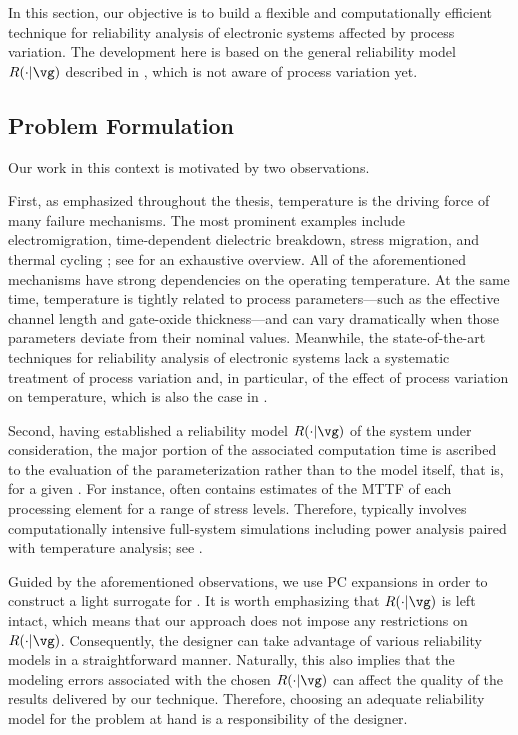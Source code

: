 In this section, our objective is to build a flexible and computationally
efficient technique for reliability analysis of electronic systems affected by
process variation. The development here is based on the general reliability
model $R(\cdot | \vg)$ described in , which is not
aware of process variation yet.

\subsection{Problem Formulation}

Our work in this context is motivated by two observations.

First, as emphasized throughout the thesis, temperature is the driving force of
many failure mechanisms. The most prominent examples include electromigration,
time-dependent dielectric breakdown, stress migration, and thermal cycling
\cite{xiang2010}; see \cite{jedec2016} for an exhaustive overview. All of the
aforementioned mechanisms have strong dependencies on the operating temperature.
At the same time, temperature is tightly related to process parameters---such as
the effective channel length and gate-oxide thickness---and can vary
dramatically when those parameters deviate from their nominal values. Meanwhile,
the state-of-the-art techniques for reliability analysis of electronic systems
lack a systematic treatment of process variation and, in particular, of the
effect of process variation on temperature, which is also the case in
.

Second, having established a reliability model $R(\cdot | \vg)$ of the system
under consideration, the major portion of the associated computation time is
ascribed to the evaluation of the parameterization \vg rather than to the model
itself, that is, for a given \vg. For instance, \vg often contains estimates of
the \ac{MTTF} of each processing element for a range of stress levels.
Therefore, \vg typically involves computationally intensive full-system
simulations including power analysis paired with temperature analysis; see
.

Guided by the aforementioned observations, we use \ac{PC} expansions in order to
construct a light surrogate for \vg. It is worth emphasizing that $R(\cdot |
\vg)$ is left intact, which means that our approach does not impose any
restrictions on $R(\cdot | \vg)$. Consequently, the designer can take advantage
of various reliability models in a straightforward manner. Naturally, this also
implies that the modeling errors associated with the chosen $R(\cdot | \vg)$ can
affect the quality of the results delivered by our technique. Therefore,
choosing an adequate reliability model for the problem at hand is a
responsibility of the designer.

